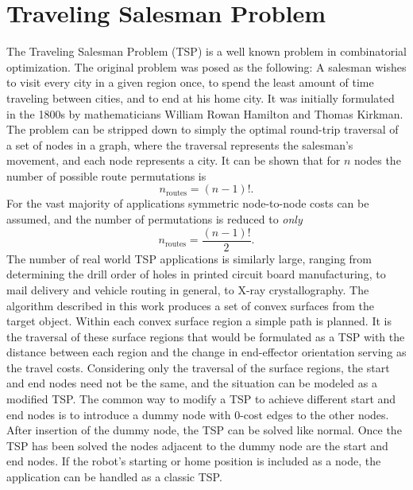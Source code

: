 \section{Traveling Salesman Problem}
The Traveling Salesman Problem (TSP) is a well known problem in combinatorial optimization.
The original problem was posed as the following:
A salesman wishes to visit every city in a given region once, to spend the least amount of time traveling between cities, and to end at his home city.
It was initially formulated in the 1800s by mathematicians William Rowan Hamilton and Thomas Kirkman\cite{Graph_theory}.
The problem can be stripped down to simply the optimal round-trip traversal of a set of nodes in a graph, where the traversal represents the salesman's movement, and each node represents a city.
It can be shown\cite{TSP_in_pursuit_of} that for $n$ nodes the number of possible route permutations is
\begin{equation*}
	n_{\text{routes}} = (n-1)!.
\end{equation*}
For the vast majority of applications symmetric node-to-node costs can be assumed, and the number of permutations is reduced to \textit{only}
\begin{equation*}
	n_{\text{routes}} = \frac{(n-1)!}{2}.
\end{equation*}
The number of real world TSP applications is similarly large\cite{TSP_theory_applications}, ranging from determining the drill order of holes in printed circuit board manufacturing\cite{TSP_PCB_manufacturing}, to mail delivery and vehicle routing in general\cite{TSP_mail_delivery}, to X-ray crystallography\cite{TSP_xray_crystallography}.
The algorithm described in this work produces a set of convex surfaces from the target object.
Within each convex surface region a simple path is planned.
It is the traversal of these surface regions that would be formulated as a TSP with the distance between each region and the change in end-effector orientation serving as the travel costs.
Considering only the traversal of the surface regions, the start and end nodes need not be the same, and the situation can be modeled as a modified TSP.
The common way to modify a TSP to achieve different start and end nodes is to introduce a dummy node with 0-cost edges to the other nodes\cite{TSP_dummy_node_mod}.
After insertion of the dummy node, the TSP can be solved like normal.
Once the TSP has been solved the nodes adjacent to the dummy node are the start and end nodes.
If the robot's starting or home position is included as a node, the application can be handled as a classic TSP.

